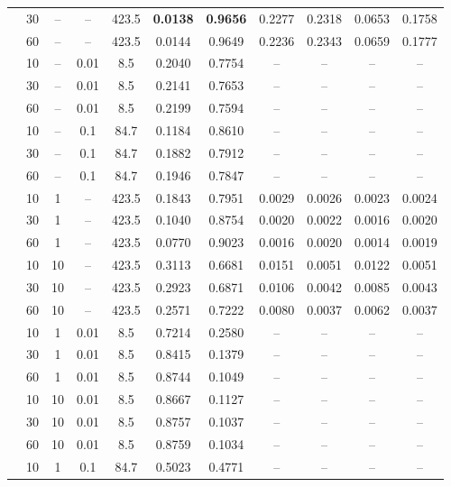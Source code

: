 \begin{longtable}{@{}l c c c c c c c c c c@{}}
	& 30 & -- & -- & 423.5 & \textbf{0.0138} & \textbf{0.9656} & 0.2277 & 0.2318 & 0.0653 & 0.1758 \\
	& 60 & -- & -- & 423.5 & 0.0144 & 0.9649 & 0.2236 & 0.2343 & 0.0659 & 0.1777 \\
	\arrayrulecolor{gray!60}\midrule\arrayrulecolor{black}
	\multirow{6}{*}{\textbf{TopK}} & 10 & -- & 0.01 & 8.5 & 0.2040 & 0.7754 & -- & -- & -- & -- \\
	& 30 & -- & 0.01 & 8.5 & 0.2141 & 0.7653 & -- & -- & -- & -- \\
	& 60 & -- & 0.01 & 8.5 & 0.2199 & 0.7594 & -- & -- & -- & -- \\
	& 10 & -- & 0.1 & 84.7 & 0.1184 & 0.8610 & -- & -- & -- & -- \\
	& 30 & -- & 0.1 & 84.7 & 0.1882 & 0.7912 & -- & -- & -- & -- \\
	& 60 & -- & 0.1 & 84.7 & 0.1946 & 0.7847 & -- & -- & -- & -- \\
	\arrayrulecolor{gray!60}\midrule\arrayrulecolor{black}
	\multirow{6}{*}{\textbf{DP + FLTrust}} & 10 & 1 & -- & 423.5 & 0.1843 & 0.7951 & 0.0029 & 0.0026 & 0.0023 & 0.0024 \\
	& 30 & 1 & -- & 423.5 & 0.1040 & 0.8754 & 0.0020 & 0.0022 & 0.0016 & 0.0020 \\
	& 60 & 1 & -- & 423.5 & 0.0770 & 0.9023 & 0.0016 & 0.0020 & 0.0014 & 0.0019 \\
	& 10 & 10 & -- & 423.5 & 0.3113 & 0.6681 & 0.0151 & 0.0051 & 0.0122 & 0.0051 \\
	& 30 & 10 & -- & 423.5 & 0.2923 & 0.6871 & 0.0106 & 0.0042 & 0.0085 & 0.0043 \\
	& 60 & 10 & -- & 423.5 & 0.2571 & 0.7222 & 0.0080 & 0.0037 & 0.0062 & 0.0037 \\
	\arrayrulecolor{gray!60}\midrule\arrayrulecolor{black}
	\multirow{12}{*}{\textbf{DP + TopK}} & 10 & 1 & 0.01 & 8.5 & 0.7214 & 0.2580 & -- & -- & -- & -- \\
	& 30 & 1 & 0.01 & 8.5 & 0.8415 & 0.1379 & -- & -- & -- & -- \\
	& 60 & 1 & 0.01 & 8.5 & 0.8744 & 0.1049 & -- & -- & -- & -- \\
	& 10 & 10 & 0.01 & 8.5 & 0.8667 & 0.1127 & -- & -- & -- & -- \\
	& 30 & 10 & 0.01 & 8.5 & 0.8757 & 0.1037 & -- & -- & -- & -- \\
	& 60 & 10 & 0.01 & 8.5 & 0.8759 & 0.1034 & -- & -- & -- & -- \\
	& 10 & 1 & 0.1 & 84.7 & 0.5023 & 0.4771 & -- & -- & -- & -- \\

\end{longtable}
